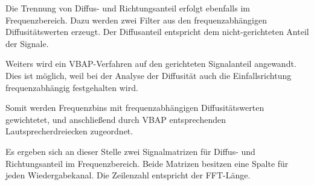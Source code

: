

Die Trennung von Diffus- und Richtungsanteil erfolgt ebenfalls im Frequenzbereich. Dazu werden zwei Filter aus den frequenzabhängigen Diffusitätswerten erzeugt. Der Diffusanteil entspricht dem nicht-gerichteten Anteil der Signale.

Weiters wird ein VBAP-Verfahren auf den gerichteten Signalanteil angewandt. Dies ist möglich, weil bei der Analyse der Diffusität auch die Einfallsrichtung frequenzabhängig festgehalten wird.

Somit werden Frequenzbins mit frequenzabhängigen Diffusitätswerten gewichtetet, und anschließend durch VBAP entsprechenden Lautsprecherdreiecken zugeordnet.

Es ergeben sich an dieser Stelle zwei Signalmatrizen für Diffus- und Richtungsanteil im Frequenzbereich. Beide Matrizen besitzen eine Spalte für jeden Wiedergabekanal. Die Zeilenzahl entspricht der FFT-Länge.